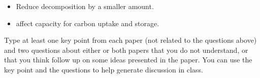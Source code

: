 \documentclass[11pt, addpoints]{exam}
\begin{document}
\begin{questions}
\begin{solution}
\begin{itemize}
	\item Reduce decomposition by a smaller amount.

	\item affect capacity for carbon uptake and storage.
\end{itemize}
\end{solution}
\else
\fi

\question[5]
Type at least one key point from each paper (not related to the
  questions above) and two questions about either or both papers that
  you do not understand, or that you think follow up on some ideas
  presented in the paper. You can use the key point and the questions to
  help generate discussion in class. 


\end{questions}
\end{document}
